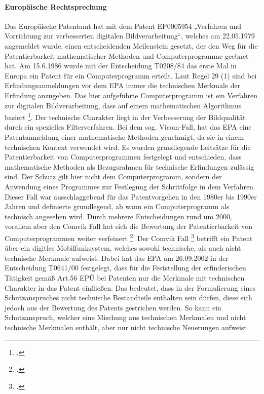 \paragraph{Europäische Rechtsprechung}
Das Europäische Patentamt hat mit dem Patent EP0005954 
„Verfahren und Vorrichtung zur verbesserten digitalen Bildverarbeitung“,
welches am 22.05.1979 angemeldet wurde,
einen entscheidenden Meilenstein gesetzt, 
der den Weg für die Patentierbarkeit mathematischer Methoden und 
Computerprogramme geebnet hat. 
Am 15.6.1986 wurde mit der Entscheidung T0208/84 das
erste Mal in Europa ein Patent für ein Computerprogramm erteilt.
Laut Regel 29 (1) sind bei Erfindungsanmeldungen vor dem EPA
immer die 
technischen Merkmale der Erfindung anzugeben.
Das hier aufgeführte Computerprogramm ist ein 
Verfahren zur digitalen Bildverarbeitung, dass
auf einem mathematischen Algorithmus basiert \footcite{EPThisFile}.
Der technische Charakter liegt in der Verbesserung 
der Bildqualität durch ein spezielles Filterverfahren.
Bei dem sog. Vicom-Fall,
hat das EPA eine Patentanmeldung einer
mathematische Methoden genehmigt, da sie in einem technischen Kontext 
verwendet wird. 
Es wurden grundlegende Leitsätze für die Patentierbarkeit von
Computerprogrammen festgelegt und entschieden, dass mathematische
Methoden als Bezugsrahmen für technische Erfindungen zulässig sind.
Der Schutz gilt hier nicht dem Computerprogramm,
sondern der Anwendung eines Programmes 
zur Festlegung der Schrittfolge in dem Verfahren.
Dieser Fall war ausschlaggebend für das Patentvorgehen
in den 1980er bis 1990er Jahren und definierte grundlegend,
ab wann ein Computerprogramm als technisch angesehen wird.
Durch mehrere Entscheidungen rund um 2000, vorallem aber den 
Comvik Fall hat sich die Bewertung der Patentierbarkeit von
Computerprogrammen weiter verfeinert \footcite{ComvikAnsatz}.
Der Comvik Fall \footcite{064100Zwei} betrifft ein Patent 
über ein digitles Mobilfunksystem, welches sowohl technische,
als auch nicht technische Merkmale aufweist. 
Dabei hat das EPA am 26.09.2002 in der
Entscheidung T0641/00 festgelegt, dass für die Feststellung der
erfinderischen Tätigkeit gemäß Art.56 EPÜ bei Patenten nur die 
Merkmale mit technischen Charakter in das Patent einfließen.
Das bedeutet, dass in der Formulierung eines Schutzanspruches
nicht technische Bestandteile enthalten sein dürfen, 
diese sich jedoch aus der Bewertung des Patents gestrichen werden.
So kann ein Schutzanspruch, welcher eine Mischung aus technischen 
Merkmalen und nicht technische 
Merkmalen enthält, aber nur nicht technische Neuerungen aufweist 
